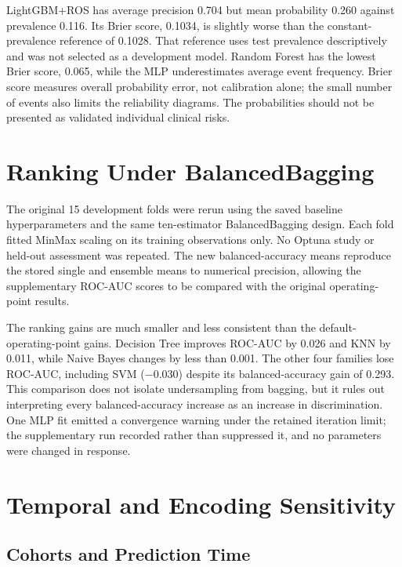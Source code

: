 LightGBM+ROS has average precision 0.704 but mean probability 0.260 against prevalence 0.116. Its Brier score, 0.1034, is slightly worse than the constant-prevalence reference of 0.1028. That reference uses test prevalence descriptively and was not selected as a development model. Random Forest has the lowest Brier score, 0.065, while the MLP underestimates average event frequency. Brier score measures overall probability error, not calibration alone; the small number of events also limits the reliability diagrams. The probabilities should not be presented as validated individual clinical risks.

\section{Ranking Under BalancedBagging}
\label{app:review_s2_bagging}

The original 15 development folds were rerun using the saved baseline hyperparameters and the same ten-estimator BalancedBagging design. Each fold fitted MinMax scaling on its training observations only. No Optuna study or held-out assessment was repeated. The new balanced-accuracy means reproduce the stored single and ensemble means to numerical precision, allowing the supplementary ROC-AUC scores to be compared with the original operating-point results.



The ranking gains are much smaller and less consistent than the default-operating-point gains. Decision Tree improves ROC-AUC by 0.026 and KNN by 0.011, while Naive Bayes changes by less than 0.001. The other four families lose ROC-AUC, including SVM ($-0.030$) despite its balanced-accuracy gain of 0.293. This comparison does not isolate undersampling from bagging, but it rules out interpreting every balanced-accuracy increase as an increase in discrimination. One MLP fit emitted a convergence warning under the retained iteration limit; the supplementary run recorded rather than suppressed it, and no parameters were changed in response.

\section{Temporal and Encoding Sensitivity}
\label{app:review_s2_temporal_models}

\subsection{Cohorts and Prediction Time}

